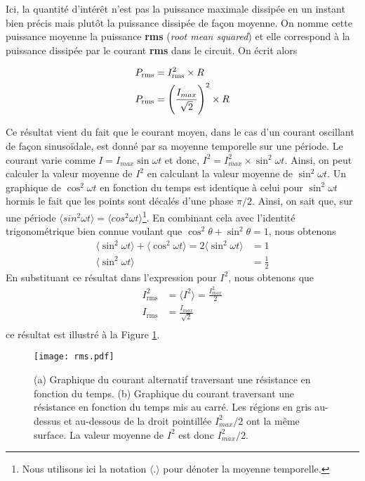 \documentclass[titlepage,oneside,a4paper,11pt]{book} %
\begin{document}
Ici, la quantité d'intérêt n'est pas la puissance maximale dissipée en un instant bien précis mais plutôt la puissance dissipée de façon moyenne.  On nomme cette puissance moyenne la puissance \textbf{rms} (\emph{root mean squared}) et elle correspond à la puissance dissipée par le courant \textbf{rms} dans le circuit. On écrit alors

\begin{align*}
    P_{\mathrm{rms}}&=I_{\mathrm{rms}}^2\times R\\
    P_{\mathrm{rms}}&=\Bigg{(}\frac{I_{max}}{\sqrt{2}}\Bigg{)}^2\times R
\end{align*}

Ce résultat vient du fait que le courant moyen, dans le cas d'un courant oscillant de façon sinusoïdale, est donné par sa moyenne temporelle sur une période. Le courant varie comme $I=I_{max}\sin \omega t$ et donc, $I^2 = I^2_{max}\times\sin^2 \omega t$. Ainsi, on peut calculer la valeur moyenne de $I^2$ en calculant la valeur moyenne de $\sin^2 \omega t$.  Un graphique de $\cos^2 \omega t$ en fonction du temps est identique à celui pour $\sin^2 \omega t$ hormis le fait que les points sont décalés d'une phase $\pi/2$. Ainsi, on sait que, sur une période $\langle sin^2 \omega t \rangle = \langle cos^2 \omega t \rangle$\footnote{Nous utilisons ici la notation $\langle . \rangle$ pour dénoter la moyenne temporelle.}. En combinant cela avec l'identité trigonométrique bien connue voulant que $\cos^2 \theta + \sin^2 \theta =1$, nous obtenons
\begin{align*}
    \langle \sin^2 \omega t\rangle + \langle \cos^2 \omega t\rangle = 2\langle \sin^2\omega t\rangle &=1\\
    \langle \sin^2\omega t\rangle &= \frac{1}{2}
\end{align*}
En substituant ce résultat dans l'expression pour $I^2$, nous obtenons que
\begin{align*}
    I^2_{\mathrm{rms}} &= \langle I^2 \rangle = \frac{I_{max} ^2}{2}\\ 
    I_{\mathrm{rms}}  &= \frac{I_{max}}{\sqrt{2}} \\
\end{align*}
ce résultat est illustré à la Figure \ref{fig:rms}.
\begin{figure}[H]
\centering
\texttt{[image: rms.pdf]}
\caption{(a) Graphique du courant alternatif traversant une résistance en fonction du temps. (b) Graphique du courant traversant une résistance en fonction du temps mis au carré. Les régions en gris au-dessus et au-dessous de la droit pointillée $I^2_{max}/2$ ont la même surface. La valeur moyenne de $I^2$ est donc $I_{max}^2/2$.}
\label{fig:rms}
\end{figure}
\end{document}
